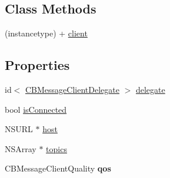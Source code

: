 \subsection*{Class Methods}
\begin{DoxyCompactItemize}
\item 
(instancetype) + \hyperlink{interface_c_b_message_client_acef3f93cc08d62c70a978d81b04d8f6f}{client}
\end{DoxyCompactItemize}
\subsection*{Properties}
\begin{DoxyCompactItemize}
\item 
id$<$ \hyperlink{protocol_c_b_message_client_delegate-p}{C\+B\+Message\+Client\+Delegate} $>$ \hyperlink{interface_c_b_message_client_a6a94ee89f64cbc4bef855ecdda6fbf85}{delegate}
\item 
bool \hyperlink{interface_c_b_message_client_a6a385330b831471122ffb52b101422fb}{is\+Connected}
\item 
N\+S\+U\+R\+L $\ast$ \hyperlink{interface_c_b_message_client_a770ff8d5b798d220ecc7bc00804112d4}{host}
\item 
N\+S\+Array $\ast$ \hyperlink{interface_c_b_message_client_a41081dc92c32ef8aa7ab364463825398}{topics}
\item 
\hypertarget{interface_c_b_message_client_a735d7e8e3ed831a23e3890cecd45e9e8}{C\+B\+Message\+Client\+Quality {\bfseries qos}}\label{interface_c_b_message_client_a735d7e8e3ed831a23e3890cecd45e9e8}

\end{DoxyCompactItemize}



